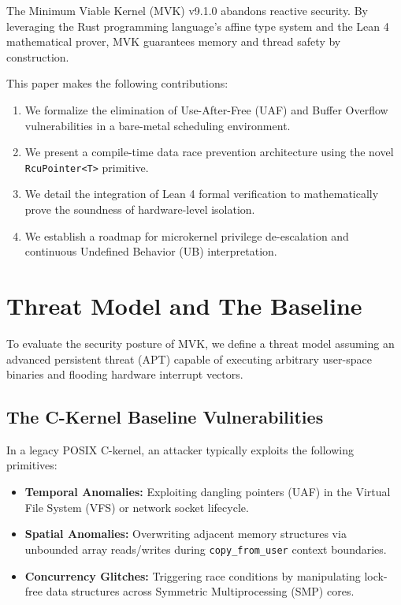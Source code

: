 \documentclass[conference]{IEEEtran}
\begin{document}
The Minimum Viable Kernel (MVK) v9.1.0 abandons reactive security. By leveraging the Rust programming language's affine type system and the Lean 4 mathematical prover, MVK guarantees memory and thread safety by construction.

This paper makes the following contributions:
\begin{enumerate}
    \item We formalize the elimination of Use-After-Free (UAF) and Buffer Overflow vulnerabilities in a bare-metal scheduling environment.
    \item We present a compile-time data race prevention architecture using the novel \texttt{RcuPointer<T>} primitive.
    \item We detail the integration of Lean 4 formal verification to mathematically prove the soundness of hardware-level isolation.
    \item We establish a roadmap for microkernel privilege de-escalation and continuous Undefined Behavior (UB) interpretation.
\end{enumerate}

\section{Threat Model and The Baseline}
To evaluate the security posture of MVK, we define a threat model assuming an advanced persistent threat (APT) capable of executing arbitrary user-space binaries and flooding hardware interrupt vectors.

\subsection{The C-Kernel Baseline Vulnerabilities}
In a legacy POSIX C-kernel, an attacker typically exploits the following primitives:
\begin{itemize}
    \item \textbf{Temporal Anomalies:} Exploiting dangling pointers (UAF) in the Virtual File System (VFS) or network socket lifecycle.
    \item \textbf{Spatial Anomalies:} Overwriting adjacent memory structures via unbounded array reads/writes during \texttt{copy\_from\_user} context boundaries.
    \item \textbf{Concurrency Glitches:} Triggering race conditions by manipulating lock-free data structures across Symmetric Multiprocessing (SMP) cores.
\end{itemize}
\end{document}
